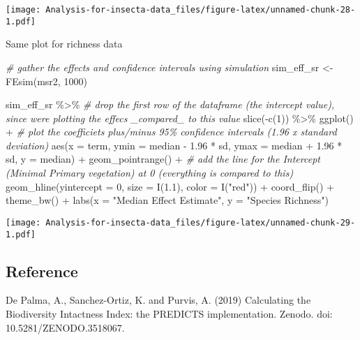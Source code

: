 \documentclass[
]{article}
\newenvironment{Shaded}{\begin{snugshade}}{\end{snugshade}}
\newcommand{\AttributeTok}[1]{\textcolor[rgb]{0.77,0.63,0.00}{#1}}
\newcommand{\CommentTok}[1]{\textcolor[rgb]{0.56,0.35,0.01}{\textit{#1}}}
\newcommand{\DecValTok}[1]{\textcolor[rgb]{0.00,0.00,0.81}{#1}}
\newcommand{\FloatTok}[1]{\textcolor[rgb]{0.00,0.00,0.81}{#1}}
\newcommand{\FunctionTok}[1]{\textcolor[rgb]{0.00,0.00,0.00}{#1}}
\newcommand{\NormalTok}[1]{#1}
\newcommand{\OtherTok}[1]{\textcolor[rgb]{0.56,0.35,0.01}{#1}}
\newcommand{\SpecialCharTok}[1]{\textcolor[rgb]{0.00,0.00,0.00}{#1}}
\newcommand{\StringTok}[1]{\textcolor[rgb]{0.31,0.60,0.02}{#1}}
\begin{document}
\texttt{[image: Analysis-for-insecta-data\_files/figure-latex/unnamed-chunk-28-1.pdf]}

Same plot for richness data

\begin{Shaded}
\begin{Highlighting}[]
\CommentTok{\# gather the effects and confidence intervals using simulation}
\NormalTok{sim\_eff\_sr }\OtherTok{\textless{}{-}} \FunctionTok{FEsim}\NormalTok{(msr2, }\DecValTok{1000}\NormalTok{)}

\NormalTok{sim\_eff\_sr }\SpecialCharTok{\%\textgreater{}\%}
  \CommentTok{\# drop the first row of the dataframe (the intercept value), since we\textquotesingle{}re plotting the effecs \_compared\_ to this value}
  \FunctionTok{slice}\NormalTok{(}\SpecialCharTok{{-}}\FunctionTok{c}\NormalTok{(}\DecValTok{1}\NormalTok{)) }\SpecialCharTok{\%\textgreater{}\%}
  \FunctionTok{ggplot}\NormalTok{() }\SpecialCharTok{+}
  \CommentTok{\# plot the coefficiets plus/minus 95\% confidence intervals (1.96 x standard deviation)}
  \FunctionTok{aes}\NormalTok{(}\AttributeTok{x =}\NormalTok{ term, }\AttributeTok{ymin =}\NormalTok{ median }\SpecialCharTok{{-}} \FloatTok{1.96} \SpecialCharTok{*}\NormalTok{ sd,}
      \AttributeTok{ymax =}\NormalTok{ median }\SpecialCharTok{+} \FloatTok{1.96} \SpecialCharTok{*}\NormalTok{ sd, }\AttributeTok{y =}\NormalTok{ median) }\SpecialCharTok{+}
  \FunctionTok{geom\_pointrange}\NormalTok{() }\SpecialCharTok{+}
  \CommentTok{\# add the line for the Intercept (Minimal Primary vegetation) at 0 (everything is compared to this)}
  \FunctionTok{geom\_hline}\NormalTok{(}\AttributeTok{yintercept =} \DecValTok{0}\NormalTok{, }\AttributeTok{size =} \FunctionTok{I}\NormalTok{(}\FloatTok{1.1}\NormalTok{), }\AttributeTok{color =} \FunctionTok{I}\NormalTok{(}\StringTok{"red"}\NormalTok{)) }\SpecialCharTok{+}
  \FunctionTok{coord\_flip}\NormalTok{() }\SpecialCharTok{+}
  \FunctionTok{theme\_bw}\NormalTok{() }\SpecialCharTok{+} \FunctionTok{labs}\NormalTok{(}\AttributeTok{x =} \StringTok{"Median Effect Estimate"}\NormalTok{, }\AttributeTok{y =} \StringTok{"Species Richness"}\NormalTok{)}
\end{Highlighting}
\end{Shaded}

\texttt{[image: Analysis-for-insecta-data\_files/figure-latex/unnamed-chunk-29-1.pdf]}

\hypertarget{reference}{%
\subsection{Reference}\label{reference}}

De Palma, A., Sanchez-Ortiz, K. and Purvis, A. (2019) Calculating the
Biodiversity Intactness Index: the PREDICTS implementation. Zenodo. doi:
10.5281/ZENODO.3518067.
\end{document}
